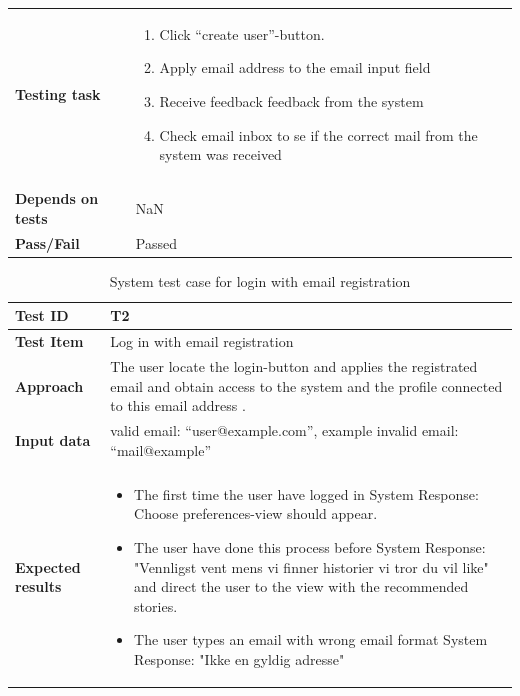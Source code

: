 \begin{appendices}
\begin{table}[H]
\begin{tabular}[b]{ | l | l  |}
			\textbf{Testing task} & \begin{minipage}{5in}
			\begin{enumerate}[noitemsep]
			\item Click  “create user”-button.
			\item Apply email address to the email input field 
			\item Receive feedback feedback from the system
			\item Check email inbox to se if the correct mail from the system was received 
			 \end{enumerate} \end{minipage}
			\\&\\[-3.8ex] \hline
			\textbf{Depends on tests}& NaN \\ \hline	
			\textbf{Pass/Fail} & Passed \\\hline				
		\end{tabular}
	\label{Tab:systemTesting1}
\end{table}


	\begin{table}[H]
		\centering
		\caption{System test case for login with email registration}
		\begin{tabular}{ | l | l  |}
			\hline
			\textbf{Test ID} & T2  \\ \hline 
			\textbf{Test Item} & Log in with email registration \\ \hline
			\textbf{Approach} & \begin{minipage}{5in}The user locate the login-button and applies the registrated email and obtain access to the system and the profile connected to this email address . \end{minipage}\\ \hline
			\textbf{Input data} &  valid email: “user@example.com”, \newline example invalid email: “mail@example”\\ \hline&\\[-3.8ex]
			\textbf{Expected results} & \begin{minipage}{5in}
			\begin{itemize}[noitemsep]
				\item The first time the user have logged in \newline System Response:  Choose preferences-view should appear.
				\item The user have done this process before \newline System Response: "Vennligst vent mens vi finner historier vi tror du vil like" and direct the user to the view with the recommended stories.
				\item The user types an email with wrong email format \newline System Response: "Ikke en gyldig adresse" 
				

\end{itemize}
\end{minipage}
\end{tabular}
\end{table}
\end{appendices}

